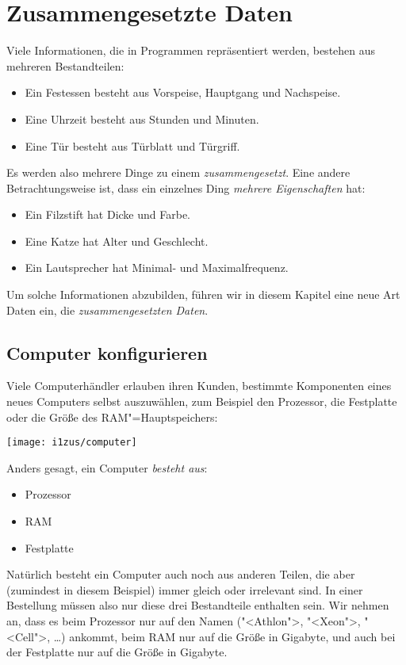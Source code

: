
\chapter{Zusammengesetzte Daten}
\label{cha:zusammengesetzte-daten}

Viele Informationen, die in Programmen repräsentiert werden, bestehen
aus mehreren Bestandteilen:
%
\begin{itemize}
\item Ein Festessen besteht aus Vorspeise, Hauptgang und Nachspeise.
\item Eine Uhrzeit besteht aus Stunden und Minuten.
\item Eine Tür besteht aus Türblatt und Türgriff.
\end{itemize}
%
Es werden also mehrere Dinge zu einem \textit{zusammengesetzt}.
Eine andere Betrachtungsweise ist, dass ein einzelnes
Ding \textit{mehrere Eigenschaften} hat:
%
\begin{itemize}
\item Ein Filzstift hat Dicke und Farbe.
\item Eine Katze hat Alter und Geschlecht.
\item Ein Lautsprecher hat Minimal- und Maximalfrequenz.
\end{itemize}
%
Um solche Informationen abzubilden, führen wir in diesem Kapitel eine neue Art
Daten ein, die \textit{zusammengesetzten
  Daten}.

\section{Computer konfigurieren}
\label{sec:computer-konfigurieren}

Viele Computerhändler erlauben ihren Kunden, bestimmte Komponenten
eines neues Computers selbst auszuwählen, zum Beispiel den Prozessor,
die Festplatte oder die Größe des RAM"=Hauptspeichers:
%
\begin{center}
  \medskip
  \texttt{[image: i1zus/computer]}
  \medskip
\end{center}
%
Anders gesagt, ein Computer \emph{besteht aus}:
%
\begin{itemize}
\item Prozessor
\item RAM
\item Festplatte
\end{itemize}
%
Natürlich besteht ein Computer auch noch aus anderen Teilen, die
aber (zumindest in diesem Beispiel) immer gleich oder irrelevant sind.
In einer Bestellung müssen also nur diese drei Bestandteile
enthalten sein.  Wir nehmen an, dass es beim Prozessor nur auf den Namen
("<Athlon">, "<Xeon">, "<Cell">, \ldots) ankommt, beim RAM nur auf die
Größe in Gigabyte, und auch bei der Festplatte nur auf die Größe in
Gigabyte.

